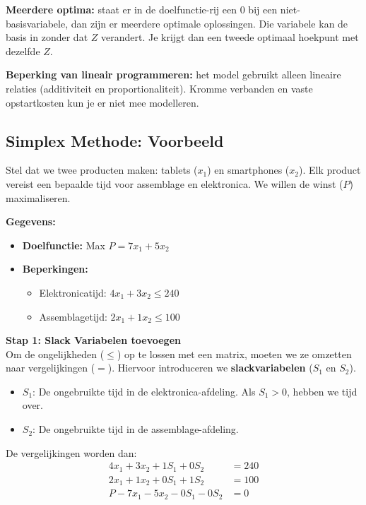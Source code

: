 \documentclass[a4paper,11pt]{article}
\begin{document}
\textbf{Meerdere optima:} staat er in de doelfunctie-rij een 0 bij een niet-basisvariabele, dan zijn er meerdere optimale oplossingen. Die variabele kan de basis in zonder dat $Z$ verandert. Je krijgt dan een tweede optimaal hoekpunt met dezelfde $Z$.

\textbf{Beperking van lineair programmeren:} het model gebruikt alleen lineaire relaties (additiviteit en proportionaliteit). Kromme verbanden en vaste opstartkosten kun je er niet mee modelleren.

\subsection{Simplex Methode: Voorbeeld}
Stel dat we twee producten maken: tablets ($x_1$) en smartphones ($x_2$). Elk product vereist een bepaalde tijd voor assemblage en elektronica. We willen de winst ($P$) maximaliseren.

\textbf{Gegevens:}
\begin{itemize}
    \item \textbf{Doelfunctie:} Max $P = 7x_1 + 5x_2$
    \item \textbf{Beperkingen:}
          \begin{itemize}
              \item Elektronicatijd: $4x_1 + 3x_2 \leq 240$
              \item Assemblagetijd: $2x_1 + 1x_2 \leq 100$
          \end{itemize}
\end{itemize}

\textbf{Stap 1: Slack Variabelen toevoegen} \\
Om de ongelijkheden ($\leq$) op te lossen met een matrix, moeten we ze omzetten naar vergelijkingen ($=$). Hiervoor introduceren we \textbf{slackvariabelen} ($S_1$ en $S_2$).
\begin{itemize}
    \item $S_1$: De ongebruikte tijd in de elektronica-afdeling. Als $S_1 > 0$, hebben we tijd over.
    \item $S_2$: De ongebruikte tijd in de assemblage-afdeling.
\end{itemize}
De vergelijkingen worden dan:
\begin{align*}
    4x_1 + 3x_2 + 1S_1 + 0S_2     & = 240 \\
    2x_1 + 1x_2 + 0S_1 + 1S_2     & = 100 \\
    P - 7x_1 - 5x_2 - 0S_1 - 0S_2 & = 0
\end{align*}
\end{document}
